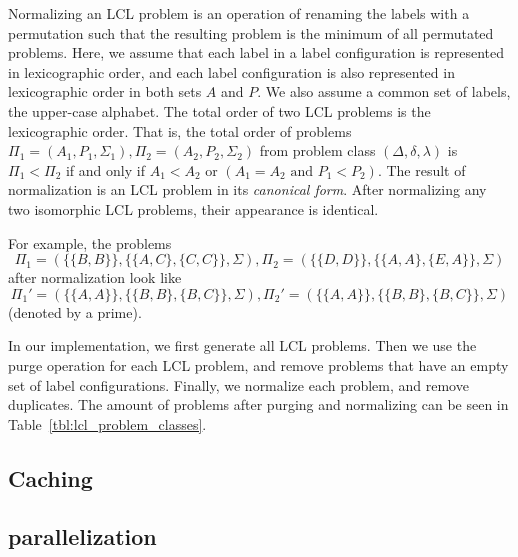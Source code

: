 Normalizing an LCL problem is an operation of renaming the labels with a permutation such that the resulting problem is the minimum of all permutated problems.
Here, we assume that each label in a label configuration is represented in lexicographic order, and each label configuration is also represented in lexicographic order in both sets $A$ and $P$.
We also assume a common set of labels, the upper-case alphabet.
The total order of two LCL problems is the lexicographic order.
That is, the total order of problems $\Pi_1=(A_1, P_1, \Sigma_1), \Pi_2=(A_2, P_2, \Sigma_2)$ from problem class $(\Delta, \delta, \lambda)$ is $\Pi_1 < \Pi_2$ if and only if $A_1 < A_2$ or $(A_1 = A_2 \text{ and } P_1 < P_2)$.
The result of normalization is an LCL problem in its \emph{canonical form}.
After normalizing any two isomorphic LCL problems, their appearance is identical.

For example, the problems $$\Pi_1=(\{\{B, B\}\}, \{\{A, C\}, \{C,C\}\}, \Sigma), \Pi_2=(\{\{D, D\}\}, \{\{A,A\},\{E, A\}\}, \Sigma)$$ after normalization look like $$\Pi_1'=(\{\{A, A\}\}, \{\{B,B\},\{B, C\}\}, \Sigma), \Pi_2'=(\{\{A, A\}\}, \{\{B,B\},\{B, C\}\}, \Sigma)$$ (denoted by a prime).

In our implementation, we first generate all LCL problems.
Then we use the purge operation for each LCL problem, and remove problems that have an empty set of label configurations.
Finally, we normalize each problem, and remove duplicates.
The amount of problems after purging and normalizing can be seen in Table~\ref{tbl:lcl_problem_classes}.



\subsection{Caching}

\subsection{parallelization}

